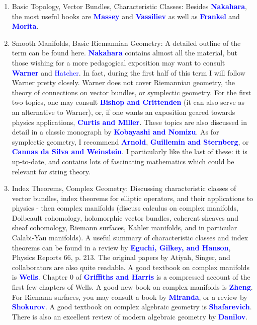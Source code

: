 \documentclass[10pt,a4paper]{book}
\theoremstyle{definition}
\begin{document}
\begin{enumerate}
\item Basic Topology, Vector Bundles, Characteristic Classes:
Besides \textcolor{blue}{\bf Nakahara}, the most useful books are
\textcolor{blue}{\bf Massey} and \textcolor{blue}{\bf Vassiliev} as well as \textcolor{blue}{\bf Frankel} and \textcolor{blue}{\bf Morita}. 

\item Smooth Manifolds, Basic Riemannian Geometry:
A detailed outline of the term can be found here. \textcolor{blue}{\bf Nakahara} contains almost all the material,
but those wishing for a more pedagogical exposition may want to consult \textcolor{blue}{\bf Warner} and \textcolor{blue}{Hatcher}.  In fact, during the first half
of this term I will follow Warner pretty closely. Warner does not cover Riemannian geometry,  the theory of
connections on vector bundles, or symplectic geometry. For the first two topics, one may consult \textcolor{blue}{\bf Bishop and
Crittenden} (it can also serve as an alternative to Warner), or, if one wants an exposition geared towards
physics applications, \textcolor{blue}{\bf Curtis and Miller}. These topics are also discussed in detail in a classic monograph by
\textcolor{blue}{\bf Kobayashi and Nomizu}.  As for symplectic geometry, I recommend \textcolor{blue}{\bf Arnold}, \textcolor{blue}{\bf Guillemin and Sternberg}, or
\textcolor{blue}{\bf Cannas da Silva and Weinstein}. I particularly like the last of these: it is up-to-date, and contains lots of
fascinating mathematics  which could be relevant for string theory. 

\item Index Theorems, Complex Geometry: Discussing characteristic classes of vector bundles, index theorems for elliptic operators, and their
applications to physics - then complex manifolds (discuss calculus on complex manifolds, Dolbeault cohomology, holomorphic vector bundles, coherent
sheaves and sheaf cohomology, Riemann surfaces, Kahler manifolds, and in particular Calabi-Yau
manifolds).   A useful summary of characteristic classes and index theorems can be found in
a review by \textcolor{blue}{\bf Eguchi, Gilkey, and Hanson}, Physics Reports 66, p. 213.  The original papers by Atiyah, Singer,
and collaborators are also quite readable. A good textbook on complex manifolds is \textcolor{blue}{\bf Wells}.  Chapter 0 of
\textcolor{blue}{\bf Griffiths and Harris} is a compressed account of the first few chapters of Wells.  A good new book on
complex manifolds is \textcolor{blue}{\bf Zheng}.  For Riemann surfaces, you may consult a book by \textcolor{blue}{\bf Miranda}, or a review
by \textcolor{blue}{\bf Shokurov}.  A good textbook on complex algebraic geometry 
is \textcolor{blue}{\bf Shafarevich}.  There is also an excellent review of modern algebraic geometry by \textcolor{blue}{\bf Danilov}. 
\end{enumerate}
\end{document}
